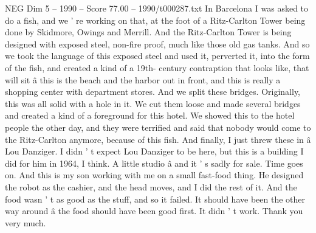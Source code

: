 \begin{textsample}{NEG Dim 5 – 1990 – Score 77.00 – 1990/t000287.txt}
In Barcelona I was asked to do a fish, and we ' re working on that, at the foot of a Ritz-Carlton Tower being done by Skidmore, Owings and Merrill.
And the Ritz-Carlton Tower is being designed with exposed steel, non-fire proof, much like those old gas tanks.
And so we took the language of this exposed steel and used it, perverted it, into the form of the fish, and created a kind of a 19th- century contraption that looks like, that will sit â this is the beach and the harbor out in front, and this is really a shopping center with department stores.
And we split these bridges.
Originally, this was all solid with a hole in it.
We cut them loose and made several bridges and created a kind of a foreground for this hotel.
We showed this to the hotel people the other day, and they were terrified and said that nobody would come to the Ritz-Carlton anymore, because of this fish.
And finally, I just threw these in â Lou Danziger.
I didn ' t expect Lou Danziger to be here, but this is a building I did for him in 1964, I think.
A little studio â and it ' s sadly for sale.
Time goes on.
And this is my son working with me on a small fast-food thing.
He designed the robot as the cashier, and the head moves, and I did the rest of it.
And the food wasn ' t as good as the stuff, and so it failed.
It should have been the other way around â the food should have been good first.
It didn ' t work.
Thank you very much.

\end{textsample}
